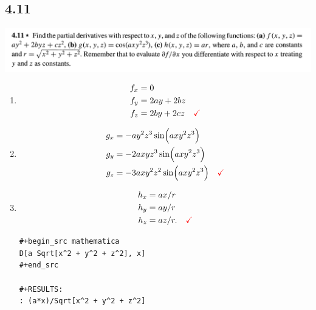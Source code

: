 \subsection{4.11}
\begin{mdframed}
  \includegraphics[width=400pt]{img/physics--classical-mechanics--taylor--q-4-11.png}
\end{mdframed}
\begin{enumerate}[label=(\alph*)]
\item
\begin{align*}
  f_x &= 0 \\
  f_y &= 2ay + 2bz \\
  f_z &= 2by + 2cz ~~~\textcolor{red}{\checkmark}
\end{align*}
\item
\begin{align*}
  g_x &= -ay^2z^3\sin(axy^2z^3) \\
  g_y &= -2axyz^3\sin(axy^2z^3) \\
  g_z &= -3axy^2z^2\sin(axy^2z^3) ~~~\textcolor{red}{\checkmark}
\end{align*}
\item
\begin{align*}
  h_x &= ax/r \\
  h_y &= ay/r \\
  h_z &= az/r. ~~~\textcolor{red}{\checkmark}
\end{align*}

\begin{verbatim}
#+begin_src mathematica
D[a Sqrt[x^2 + y^2 + z^2], x]
#+end_src

#+RESULTS:
: (a*x)/Sqrt[x^2 + y^2 + z^2]

\end{verbatim}
\end{enumerate}

